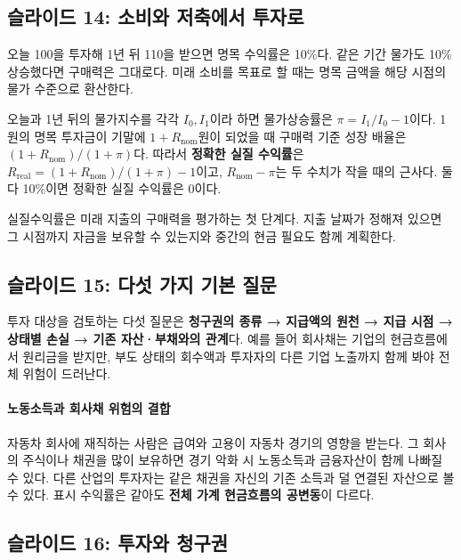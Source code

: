 \documentclass[11pt,a4paper]{article}
\begin{document}
\subsection{슬라이드 14: 소비와 저축에서 투자로}

오늘 100을 투자해 1년 뒤 110을 받으면 명목 수익률은 10\%다. 같은 기간 물가도 10\% 상승했다면 구매력은 그대로다. 미래 소비를 목표로 할 때는 명목 금액을 해당 시점의 물가 수준으로 환산한다.
\par

오늘과 1년 뒤의 물가지수를 각각 $I_0,I_1$이라 하면 물가상승률은 $\pi=I_1/I_0-1$이다. 1원의 명목 투자금이 기말에 $1+R_{\mathrm{nom}}$원이 되었을 때 구매력 기준 성장 배율은 $(1+R_{\mathrm{nom}})/(1+\pi)$다. 따라서 \textbf{정확한 실질 수익률}은 $R_{\mathrm{real}}=(1+R_{\mathrm{nom}})/(1+\pi)-1$이고, $R_{\mathrm{nom}}-\pi$는 두 수치가 작을 때의 근사다. 둘 다 10\%이면 정확한 실질 수익률은 0이다.
\par

실질수익률은 미래 지출의 구매력을 평가하는 첫 단계다. 지출 날짜가 정해져 있으면 그 시점까지 자금을 보유할 수 있는지와 중간의 현금 필요도 함께 계획한다.
\par

\subsection{슬라이드 15: 다섯 가지 기본 질문}

투자 대상을 검토하는 다섯 질문은 \textbf{청구권의 종류 → 지급액의 원천 → 지급 시점 → 상태별 손실 → 기존 자산·부채와의 관계}다. 예를 들어 회사채는 기업의 현금흐름에서 원리금을 받지만, 부도 상태의 회수액과 투자자의 다른 기업 노출까지 함께 봐야 전체 위험이 드러난다.
\par

\paragraph{노동소득과 회사채 위험의 결합}

자동차 회사에 재직하는 사람은 급여와 고용이 자동차 경기의 영향을 받는다. 그 회사의 주식이나 채권을 많이 보유하면 경기 악화 시 노동소득과 금융자산이 함께 나빠질 수 있다. 다른 산업의 투자자는 같은 채권을 자신의 기존 소득과 덜 연결된 자산으로 볼 수 있다. 표시 수익률은 같아도 \textbf{전체 가계 현금흐름의 공변동}이 다르다.
\par

\subsection{슬라이드 16: 투자와 청구권}
\end{document}
